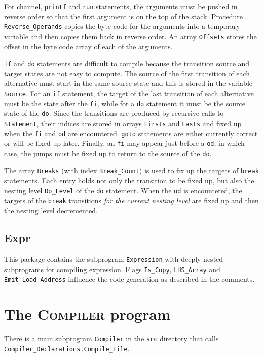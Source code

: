 \documentclass[11pt]{article}
\newcommand*{\cmp}{\textsc{Compiler}}
\newcommand*{\p}[1]{\texttt{#1}}
\begin{document}
For channel, \p{printf} and \p{run} statements, the arguments must be
pushed in reverse order so that the first argument is on the top of the
stack. Procedure \p{Reverse\_Operands} copies the byte code for the
arguments into a temporary variable and then copies them back in reverse
order. An array \p{Offsets} stores the offset in the byte code array of
each of the arguments.

\p{if} and \p{do} statements are difficult to compile because the
transition source and target states are not easy to compute. The source
of the first transition of each alternative must start in the same
source state and this is stored in the variable \p{Source}. For an
\p{if} statement, the target of the last transition of each alternative
must be the state after the \p{fi}, while for a \p{do} statement it must
be the source state of the \p{do}. Since the transitions are produced by
recursive calls to \p{Statement}, their indices are stored in arrays
\p{Firsts} and \p{Lasts} and fixed up when the \p{fi} and \p{od} are
encountered. \p{goto} statements are either currently correct or will be
fixed up later. Finally, an \p{fi} may appear just before a \p{od}, in
which case, the jumps must be fixed up to return to the source of the
\p{do}.

The array \p{Breaks} (with index \p{Break\_Count}) is used to fix up the
targets of \p{break} statements. Each entry holds not only the
transition to be fixed up, but also the nesting level \p{Do\_Level} of
the \p{do} statement. When the \p{od} is encountered, the targets of
the \p{break} transitions \emph{for the current nesting level} are fixed
up and then the nesting level decremented.
 

\subsection{Expr}
This package contains the subprogram \p{Expression} with deeply nested
subprograms for compiling expression. Flags \p{Is\_Copy}, \p{LHS\_Array}
and \p{Emit\_Load\_Address} influence the code generation as described
in the comments.

\section{The \cmp{} program}

There is a main subprogram \p{Compiler} in the \p{src} directory that
calls\\ \p{Compiler\_Declarations.Compile\_File}.
\end{document}
